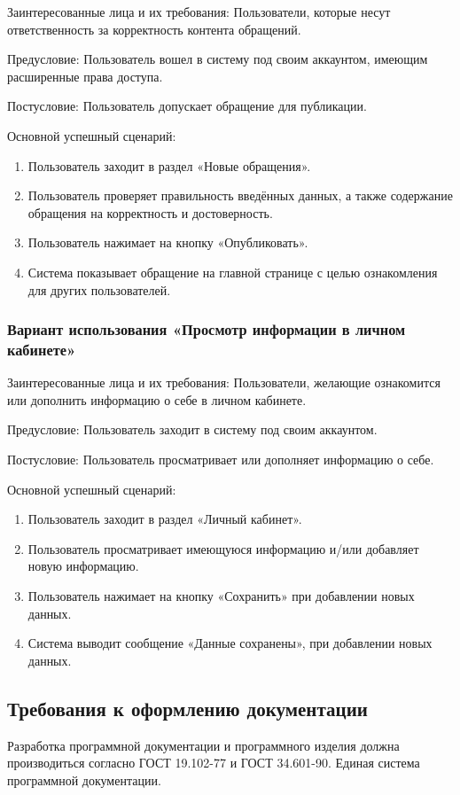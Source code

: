 Заинтересованные лица и их требования: Пользователи, которые несут ответственность за корректность контента обращений.

Предусловие: Пользователь вошел в систему под своим аккаунтом, имеющим расширенные права доступа.

Постусловие: Пользователь допускает обращение для публикации.

Основной успешный сценарий: 

\begin{enumerate}
	\item Пользователь заходит в раздел «Новые обращения».
	\item Пользователь проверяет правильность введённых данных, а также содержание обращения на корректность и достоверность.
	\item Пользователь нажимает на кнопку «Опубликовать». 
	\item Система показывает обращение на главной странице с целью ознакомления для других пользователей.
\end{enumerate}

\subsubsection {Вариант использования «Просмотр информации в личном кабинете»}

Заинтересованные лица и их требования: Пользователи, желающие ознакомится или дополнить информацию о себе в личном кабинете.

Предусловие: Пользователь заходит в систему под своим аккаунтом. 

Постусловие: Пользователь просматривает или дополняет информацию о себе.

Основной успешный сценарий: 

\begin{enumerate}
	\item Пользователь заходит в раздел «Личный кабинет».
	\item Пользователь просматривает имеющуюся информацию и/или добавляет новую информацию.
	\item Пользователь нажимает на кнопку «Сохранить» при добавлении новых данных.
	\item Система выводит сообщение «Данные сохранены», при добавлении новых данных.
\end{enumerate}


\subsection{Требования к оформлению документации}

Разработка программной документации и программного изделия должна производиться согласно ГОСТ 19.102-77 и ГОСТ 34.601-90. Единая система программной документации.

